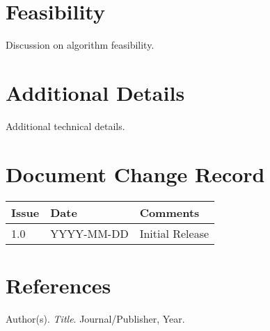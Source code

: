 \documentclass[11pt,a4paper]{article}
\begin{document}
\section{Feasibility}
Discussion on algorithm feasibility.

\appendix
\section{Additional Details}
Additional technical details.

\newpage
\section*{Document Change Record}
\begin{tabular}{lp{2cm}p{8cm}}
\toprule
Issue & Date & Comments \\
\midrule
1.0 & YYYY-MM-DD & Initial Release \\
\bottomrule
\end{tabular}

\newpage
\section*{References}
\begin{thebibliography}{99}
 Author(s). \textit{Title}. Journal/Publisher, Year.
\end{thebibliography}
\end{document}
